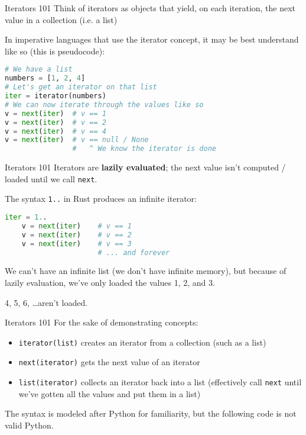 \documentclass[../index.tex]{subfiles}
\begin{document}
\renewcommand{\currenttitle}{Iterators 101}
\begin{frame}[fragile]{\currenttitle}
  Think of iterators as objects that yield, on each iteration, the next value
  in a collection (i.e. a list)

  In imperative languages that use the iterator concept, it may be best
  understand like so (this is pseudocode): \\[1em]

  \begin{lstlisting}[language=Python]
# We have a list
numbers = [1, 2, 4]
# Let's get an iterator on that list
iter = iterator(numbers)
# We can now iterate through the values like so
v = next(iter)  # v == 1
v = next(iter)  # v == 2
v = next(iter)  # v == 4
v = next(iter)  # v == null / None
                #   ^ We know the iterator is done
  \end{lstlisting}
\end{frame}

\begin{frame}[fragile]{\currenttitle}
  Iterators are \textbf{lazily evaluated}; the next value isn't computed /
  loaded until we call \texttt{next}.

  The syntax \texttt{1..} in Rust produces an infinite iterator:

  \begin{lstlisting}[language=Python]
    iter = 1..
    v = next(iter)    # v == 1
    v = next(iter)    # v == 2
    v = next(iter)    # v == 3
                      # ... and forever
  \end{lstlisting}

  We can't have an infinite list (we don't have infinite memory), but because of
  lazily evaluation, we've only loaded the values 1, 2, and 3.

  4, 5, 6, \ldots aren't loaded.
\end{frame}

\begin{frame}[fragile]{\currenttitle}
  For the sake of demonstrating concepts:

  \begin{itemize}
    \item \texttt{iterator(list)} creates an iterator from a collection (such as a
          list)
    \item \texttt{next(iterator)} gets the next value of an iterator
    \item \texttt{list(iterator)} collects an iterator back into a list
          (effectively call \texttt{next} until we've gotten all the values and put
          them in a list)
  \end{itemize}

  \vspace*{2em}
  The syntax is modeled after Python for familiarity, but the following code is
  not valid Python.
\end{frame}
\end{document}
